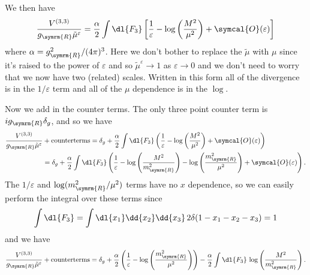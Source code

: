 \documentclass[fleqn]{NotesClass}
\newcommand{\order}{\symcal{O}}
\newcommand{\renormalised}{\symrm{R}}
\begin{document}
    We then have
    \begin{equation}
        \frac{V^{(3,3)}}{g_{\renormalised}\tilde{\mu}^\varepsilon} = \frac{\alpha}{2} \int \dl{F_3} \left[ \frac{1}{\varepsilon} - \log\left( \frac{M^2}{\mu^2} \right) + \order(\varepsilon) \right]
    \end{equation}
    where \(\alpha = g_{\renormalised}^2/(4\pi)^3\).
    Here we don't bother to replace the \(\tilde{\mu}\) with \(\mu\) since it's raised to the power of \(\varepsilon\) and so \(\tilde{\mu}^\varepsilon \to 1\) as \(\varepsilon \to 0\) and we don't need to worry that we now have two (related) scales.
    Written in this form all of the divergence is in the \(1/\varepsilon\) term and all of the \(\mu\) dependence is in the \(\log\).
    
    Now we add in the counter terms.
    The only three point counter term is \(ig_{\renormalised}\delta_g\), and so we have
    \begin{align}
        \frac{V^{(3,3)}}{g_{\renormalised}\tilde{\mu}^\varepsilon} &+ \text{counterterms} = \delta_g + \frac{\alpha}{2} \int \dl{F_3} \left( \frac{1}{\varepsilon} - \log\left( \frac{M^2}{\mu^2} \right) + \order(\varepsilon) \right)\\
        &= \delta_g + \frac{\alpha}{2} \int \dl{F_3} \left( \frac{1}{\varepsilon} - \log\left( \frac{M^2}{m_{\renormalised}^2} \right) - \log\left( \frac{m_{\renormalised}^2}{\mu^2} \right) +  \order(\varepsilon) \right).
    \end{align}
    The \(1/\varepsilon\) and \(\log(m_{\renormalised}^2/\mu^2)\) terms have no \(x\) dependence, so we can easily perform the integral over these terms since
    \begin{equation}
        \int \dl{F_3} = \int \dl{x_1}\dd{x_2}\dd{x_3} \, 2\delta(1 - x_1 - x_2 - x_3) = 1
    \end{equation}
    and we have
    \begin{equation}
        \frac{V^{(3,3)}}{g_{\renormalised}\tilde{\mu}^\varepsilon} + \text{counterterms} = \delta_g + \frac{\alpha}{2}\left( \frac{1}{\varepsilon} - \log\left( \frac{m_{\renormalised}^2}{\mu^2} \right) \right) - \frac{\alpha}{2} \int \dl{F_3} \, \log\left( \frac{M^2}{m_{\renormalised}^2} \right).
    \end{equation}
    
\end{document}
